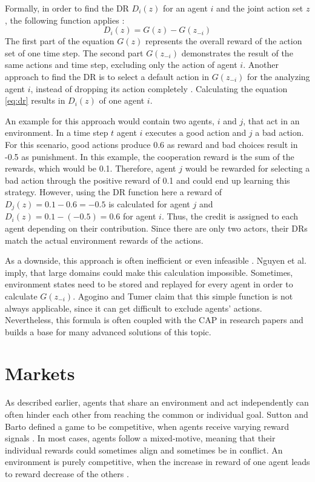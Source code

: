 Formally, in order to find the DR $D_i(z)$ for an agent $i$ and the joint action set $z$, the following function applies \cite{agtu04}:
\begin{equation}\label{eq:dr}
    D_i(z) = G(z) - G(z_{-i})
\end{equation}
The first part of the equation $G(z)$ represents the overall reward of the action set of one time step. The second part $G(z_{-i})$ demonstrates the result of the same actions and time step, excluding only the action of agent $i$. Another approach to find the DR is to select a default action in $G(z_{-i})$ for the analyzing agent $i$, instead of dropping its action completely \cite{vega96}. Calculating the equation \eqref{eq:dr} results in $D_i(z)$ of one agent $i$. 

An example for this approach would contain two agents, $i$ and $j$, that act in an environment. In a time step $t$ agent $i$ executes a good action and $j$ a bad action. For this scenario, good actions produce 0.6 as reward and bad choices result in -0.5 as punishment. In this example, the cooperation reward is the sum of the rewards, which would be 0.1. Therefore, agent $j$ would be rewarded for selecting a bad action through the positive reward of 0.1 and could end up learning this strategy. However, using the DR function here a reward of $D_j(z) = 0.1 - 0.6 = -0.5$ is calculated for agent $j$ and $D_i(z) = 0.1 - (-0.5) = 0.6$ for agent $i$. Thus, the credit is assigned to each agent depending on their contribution. Since there are only two actors, their DRs match the actual environment rewards of the actions.

As a downside, this approach is often inefficient or even infeasible \cite{ngku18}. Nguyen et al. \cite{ngku18} imply, that large domains could make this calculation impossible. Sometimes, environment states need to be stored and replayed for every agent in order to calculate $G(z_{-i})$. Agogino and Tumer \cite{agtu04} claim that this simple function is not always applicable, since it can get difficult to exclude agents' actions. Nevertheless, this formula is often coupled with the CAP in research papers and builds a base for many advanced solutions of this topic.

\section{Markets}\label{market}
As described earlier, agents that share an environment and act independently can often hinder each other from reaching the common or individual goal. Sutton and Barto defined a game to be competitive, when agents receive varying reward signals \cite{suba18}. In most cases, agents follow a mixed-motive, meaning that their individual rewards could sometimes align and sometimes be in conflict. An environment is purely competitive, when the increase in reward of one agent leads to reward decrease of the others \cite{scbe21}.

